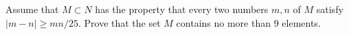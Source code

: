 Assume that $M \subset N$ has the property that every two numbers $m,n$ of $M$ satisfy $|m-n| \ge mn/25$.
Prove that the set $M$ contains no more than $9$ elements.